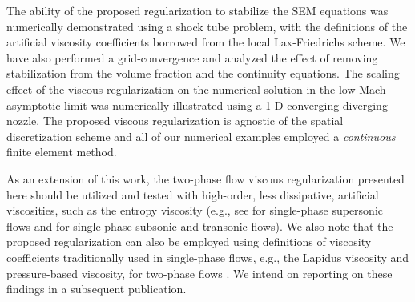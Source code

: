 The ability of the proposed regularization to stabilize the SEM equations was numerically demonstrated using a shock tube problem, with the definitions of the 
artificial viscosity coefficients borrowed from the local Lax-Friedrichs scheme. We have also performed a grid-convergence and analyzed the effect of removing 
stabilization from the volume fraction and the continuity equations. The scaling effect of the viscous regularization on the numerical solution in the low-Mach 
asymptotic limit was numerically illustrated using a 1-D converging-diverging nozzle. The proposed viscous regularization is agnostic of the spatial discretization
scheme and all of our numerical examples employed a {\it continuous} finite element method.

As an extension of this work, the two-phase flow viscous regularization presented here should be utilized and tested with high-order, less dissipative, artificial viscosities, 
such as the entropy viscosity (e.g., see \cite{jlg_EVM_JCP2011} for single-phase supersonic flows and \cite{Marco_paper_low_mach} for single-phase subsonic and transonic flows). 
We also note that the proposed regularization can also be employed using definitions of viscosity coefficients traditionally used in single-phase flows, e.g., 
the Lapidus viscosity \cite{Lapidus_paper,Lapidus_book} and pressure-based viscosity, for two-phase flows \cite{PBV_book}. We intend on reporting on these findings in 
a subsequent publication. 
%
